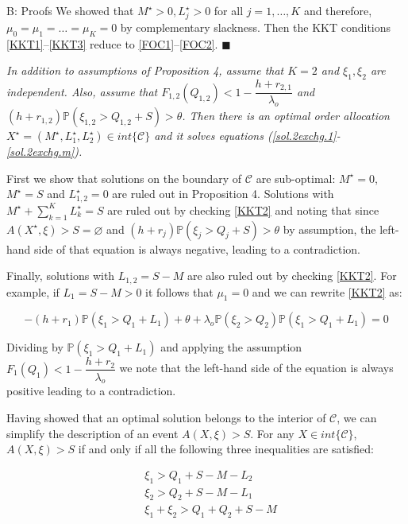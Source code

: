 \documentclass[opre,nonblindrev]{informs3}
\begin{document}
\begin{APPENDIX}{B: Proofs}
We showed that $M^{\star}>0, L^{\star}_j>0$ for all $j=1,\dots,K$ and therefore, $\mu_0=\mu_1=\dots=\mu_K=0$ by complementary slackness. Then the KKT conditions \eqref{KKT1}--\eqref{KKT3} reduce to \eqref{FOC1}--\eqref{FOC2}.
$\blacksquare$


{\it
In addition to assumptions of Proposition 4, assume that $K=2$ and $\xi_1,\xi_2$ are independent. Also, assume that $F_{1,2}(Q_{1,2})<1-\dfrac{h+r_{2,1}}{\lambda_o}$ and $(h+r_{1,2})\mathbb{P}\left(\xi_{1,2}>Q_{1,2}+S\right) > \theta$. Then there is an optimal order allocation $X^\star=(M^{\star}, L^{\star}_1, L^{\star}_2)\in int\{\mathcal{C}\}$ and it solves equations (\ref{sol.2exchg.1}-\ref{sol.2exchg.m}).
}\newline

First we show that solutions on the boundary of $\mathcal{C}$ are sub-optimal: $M^\star = 0$, $M^\star = S$ and $L^\star_{1,2} = 0$ are ruled out in Proposition 4. Solutions with $M^\star+\sum\limits_{k=1}^KL^\star_k = S$ are ruled out by checking \eqref{KKT2} and noting that since $A(X^\star,\xi)>S=\varnothing$ and $(h+r_j)\mathbb{P}\left(\xi_j>Q_j+S\right) > \theta$ by assumption, the left-hand side of that equation is always negative, leading to a contradiction.

Finally, solutions with $L_{1,2}=S-M$ are also ruled out by checking \eqref{KKT2}. For example, if $L_1=S-M>0$ it follows that $\mu_1=0$ and we can rewrite \eqref{KKT2} as:

$$-(h+r_1)\mathbb{P}(\xi_1>Q_1+L_1)+\theta +\lambda_o\mathbb{P}(\xi_2>Q_2)\mathbb{P}(\xi_1>Q_1+L_1) = 0$$

Dividing by $\mathbb{P}(\xi_1>Q_1+L_1)$ and applying the assumption $F_1(Q_1)<1-\dfrac{h+r_2}{\lambda_o}$ we note that the left-hand side of the equation is always positive leading to a contradiction.

Having showed that an optimal solution belongs to the interior of $\mathcal{C}$, we can simplify the description of an event $A(X,\xi)>S$. For any $X\in int\{\mathcal{C}\}$, $A(X,\xi)>S$ if and only if all the following three inequalities are satisfied:

\begin{subequations}
\begin{align}
& \xi_1 > Q_1 + S - M - L_2  \label{overfill.2exchg.1}\\
& \xi_2 > Q_2 + S - M - L_1  \label{overfill.2exchg.2}\\
& \xi_1 + \xi_2 > Q_1 + Q_2 + S - M \label{overfill.2exchg.3}
\end{align}
\end{subequations}


\end{APPENDIX}
\end{document}
